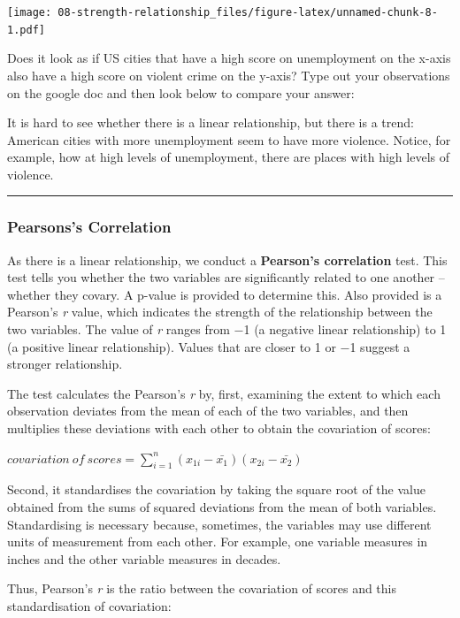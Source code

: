\documentclass[
]{book}
\begin{document}
\texttt{[image: 08-strength-relationship\_files/figure-latex/unnamed-chunk-8-1.pdf]}

Does it look as if US cities that have a high score on unemployment on the x-axis also have a high score on violent crime on the y-axis? Type out your observations on the google doc and then look below to compare your answer:

It is hard to see whether there is a linear relationship, but there is a trend: American cities with more unemployment seem to have more violence. Notice, for example, how at high levels of unemployment, there are places with high levels of violence.

\begin{center}\rule{0.5\linewidth}{0.5pt}\end{center}

\hypertarget{pearsonss-correlation}{%
\subsubsection{Pearsons's Correlation}\label{pearsonss-correlation}}

As there is a linear relationship, we conduct a \textbf{Pearson's correlation} test. This test tells you whether the two variables are significantly related to one another -- whether they covary. A p-value is provided to determine this. Also provided is a Pearson's \emph{r} value, which indicates the strength of the relationship between the two variables. The value of \emph{r} ranges from −1 (a negative linear relationship) to 1 (a positive linear relationship). Values that are closer to 1 or −1 suggest a stronger relationship.

The test calculates the Pearson's \emph{r} by, first, examining the extent to which each observation deviates from the mean of each of the two variables, and then multiplies these deviations with each other to obtain the covariation of scores:

\(covariation~ of ~scores = \sum_{i=1}^{n} (x_{1i} - \bar{x_1})(x_{2i} - \bar{x_2})\)

Second, it standardises the covariation by taking the square root of the value obtained from the sums of squared deviations from the mean of both variables. Standardising is necessary because, sometimes, the variables may use different units of measurement from each other. For example, one variable measures in inches and the other variable measures in decades.

Thus, Pearson's \emph{r} is the ratio between the covariation of scores and this standardisation of covariation:
\end{document}
